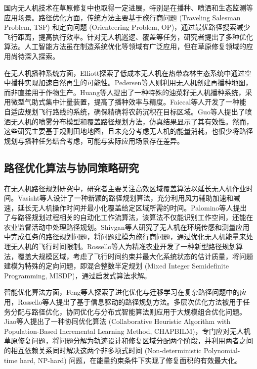 \documentclass[AutoFakeBold]{LZUThesis}
\begin{document}
国内无人机技术在草原修复中也取得一定进展，特别是在播种、喷洒\cite{faiccal2017adaptive}和生态监测等应用场景。路径优化方面，传统方法主要基于旅行商问题 (Traveling Salesman Problem, TSP) 和定向问题 (Orienteering Problem, OP)\cite{shivgan2020energy}，通过最优路径搜索减少飞行距离，提高执行效率。针对无人机巡逻、覆盖等任务，研究者提出了多种优化算法\cite{rajan2022routing,yang2015path,guo2021spraying}。人工智能方法虽在制造系统优化等领域有广泛应用\cite{renzi2014review}，但在草原修复领域的应用尚待深入探索。

在无人机播种系统方面，Elliott\cite{elliott2016potential}探索了低成本无人机在热带森林生态系统中通过空中播种实现加速自然再生的可能性。Pedersen等人\cite{pedersen2017robotic}则利用无人机创建再播种地图，而非直接用于作物生产。Huang等人\cite{huang2020design}提出了一种特殊的油菜籽无人机播种系统，采用微型气助式集中计量装置，提高了播种效率与精度。Faiccal等人\cite{faiccal2017adaptive}开发了一种能自适应规划飞行路线的系统，确保精确将农药沉积在目标区域。Guo等人\cite{guo2021spraying}提出了喷洒无人机的喷雾分布模型和覆盖路径规划方法，仿真结果显示了其有效性。然而，这些研究主要基于规则田地地图，且未充分考虑无人机的能量消耗，也很少将路径规划与播种任务结合考虑，可能与实际应用场景存在差异。

\subsection{路径优化算法与协同策略研究}

在无人机路径规划研究中，研究者主要关注高效区域覆盖算法以延长无人机作业时间。Vasisht等人\cite{vasisht2017farmbeats}设计了一种新颖的路径规划算法，充分利用风力辅助加速和减速，延长无人机操作时间并最小化覆盖给定区域所需的时间。Palomino等人\cite{palomino2019towards}提出了与路径规划过程相关的自动化工作流算法，该算法不仅能识别工作空间，还能在农业监督活动中处理路径规划。Shivgan等人\cite{shivgan2020energy}研究了无人机在环境传感和测量应用中完成任务的路径规划问题，将问题建模为旅行商问题，通过优化无人机能量来处理无人机的飞行时间限制。Rossello等人\cite{rossello2021information}为精准农业开发了一种新型路径规划算法，覆盖大规模区域，考虑了飞行时间约束并最大化系统状态的估计质量，将问题建模为特殊的定向问题，即混合整数半定规划 (Mixed Integer Semidefinite Programming, MISDP)，通过启发式算法求解。

智能优化算法方面，Feng等人探索了进化优化与迁移学习在复杂路径问题中的应用\cite{feng2015memes}，Rossello等人提出了基于信息驱动的路径规划方法\cite{rossello2021information}。多层次优化方法被用于任务分配与路径优化\cite{colson2007overview}，协同优化与分布式智能算法则应用于大规模组合优化问题\cite{huang2004cooperative}。Jiao等人\cite{JIAO2024108084}提出了一种协同优化算法 (Collaborative Heuristic Algorithm with Population-Based Incremental Learning Method, CHAPBILM)，专门应对无人机草原修复问题，将问题分解为轨迹设计和修复区域分配两个阶段，并利用两者之间的相互依赖关系同时解决这两个非多项式时间 (Non-deterministic Polynomial-time hard, NP-hard) 问题，在能量约束条件下实现了修复面积的有效最大化。
\end{document}
